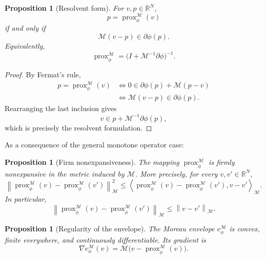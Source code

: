 \documentclass[a4paper,11pt]{book}
\theoremstyle{plain}
\newtheorem{proposition}[theorem]{Proposition}
\theoremstyle{definition}
\theoremstyle{remark}
\numberwithin{equation}{chapter}
\numberwithin{algorithm}{chapter}
\newcommand{\R}{\mathbb{R}}
\newcommand{\norm}[1]{\left\|#1\right\|}
\newcommand{\inner}[2]{\left\langle #1, #2 \right\rangle}
\newcommand{\prox}{\operatorname{prox}}
\begin{document}
	\begin{proposition}[Resolvent form]
		For \(v,p\in\R^N\),
		\[
		p=\prox_{\phi}^{\mathcal M}(v)
		\]
		if and only if
		\[
		\mathcal M(v-p)\in\partial\phi(p).
		\]
		Equivalently,
		\[
		\prox_{\phi}^{\mathcal M}
		=
		\bigl(I+\mathcal M^{-1}\partial\phi\bigr)^{-1}.
		\]
	\end{proposition}
	
	\begin{proof}
		By Fermat's rule,
		\begin{align}
			p=\prox_{\phi}^{\mathcal M}(v)
			&\iff
			0\in
			\partial\phi(p)+\mathcal M(p-v)\\
			&\iff
			\mathcal M(v-p)\in\partial\phi(p).
		\end{align}
		Rearranging the last inclusion gives
		\[
		v\in p+\mathcal M^{-1}\partial\phi(p),
		\]
		which is precisely the resolvent formulation.
	\end{proof}
	As a consequence of the general monotone operator case:
	\begin{proposition}[Firm nonexpansiveness]
		The mapping \(\prox_{\phi}^{\mathcal M}\) is firmly nonexpansive in the
		metric induced by \(\mathcal M\). More precisely, for every \(v,v'\in\R^N\),
		\begin{equation}
			\norm{
				\prox_{\phi}^{\mathcal M}(v)
				-
				\prox_{\phi}^{\mathcal M}(v')
			}_{\mathcal M}^2
			\leq
			\inner{
				\prox_{\phi}^{\mathcal M}(v)
				-
				\prox_{\phi}^{\mathcal M}(v')
			}{v-v'}_{\mathcal M}.
		\end{equation}
		In particular,
		\[
		\norm{
			\prox_{\phi}^{\mathcal M}(v)
			-
			\prox_{\phi}^{\mathcal M}(v')
		}_{\mathcal M}
		\leq
		\norm{v-v'}_{\mathcal M}.
		\]
	\end{proposition}
	
	
	\begin{proposition}[Regularity of the envelope]
		The Moreau envelope \(e_{\phi}^{\mathcal M}\) is convex, finite everywhere,
		and continuously differentiable. Its gradient is
		\begin{equation}
			\nabla e_{\phi}^{\mathcal M}(v)
			=
			\mathcal M
			\bigl(
			v-\prox_{\phi}^{\mathcal M}(v)
			\bigr).
		\end{equation}
	\end{proposition}
	
\end{document}
